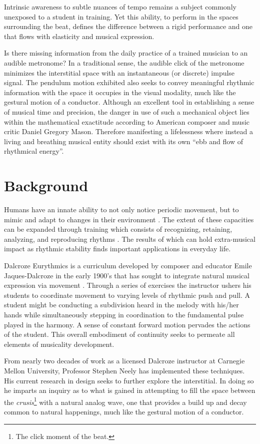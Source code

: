 Intrinsic awareness to subtle nuances of tempo remains a subject commonly unexposed to a student in training. Yet this ability, to perform in the spaces surrounding the beat, defines the difference between a rigid performance and one that flows with elasticity and musical expression.

Is there missing information from the daily practice of a trained musician to an audible metronome? In a traditional sense, the audible click of the metronome minimizes the interstitial space with an instantaneous (or discrete) impulse signal. The pendulum motion exhibited also seeks to convey meaningful rhythmic information with the space it occupies in the visual modality, much like the gestural motion of a conductor. Although an excellent tool in establishing a sense of musical time and precision, the danger in use of such a mechanical object lies within the mathematical exactitude according to American composer and music critic Daniel Gregory Mason. Therefore manifesting a lifelessness where instead a living and breathing musical entity should exist with its own ``ebb and flow of rhythmical energy''\cite{fitts2008new}.

\section{Background}
Humans have an innate ability to not only notice periodic movement, but to mimic and adapt to changes in their environment \cite{clayton2005time}. The extent of these capacities can be expanded through training which consists of recognizing, retaining, analyzing, and reproducing rhythms \cite{holland2010feeling}. The results of which can hold extra-musical impact as rhythmic stability finds important applications in everyday life.

Dalcroze Eurythmics is a curriculum developed by composer and educator Emile Jaques-Dalcroze in the early 1900's that has sought to integrate natural musical expression via movement \cite{jaques1930eurhythmics}. Through a series of exercises the instructor ushers his students to coordinate movement to varying levels of rhythmic push and pull. A student might be conducting a subdivision heard in the melody with his/her hands while simultaneously stepping in coordination to the fundamental pulse played in the harmony. A sense of constant forward motion pervades the actions of the student. This overall embodiment of continuity seeks to permeate all elements of musicality development.

From nearly two decades of work as a licensed Dalcroze instructor at Carnegie Mellon University, Professor Stephen Neely has implemented these techniques. His current research in design seeks to further explore the interstitial. In doing so he imparts an inquiry as to what is gained in attempting to fill the space between the \textit{crusis}\footnote{ The click moment of the beat.} with a natural analog wave, one that provides a build up and decay common to natural happenings, much like the gestural motion of a conductor.

